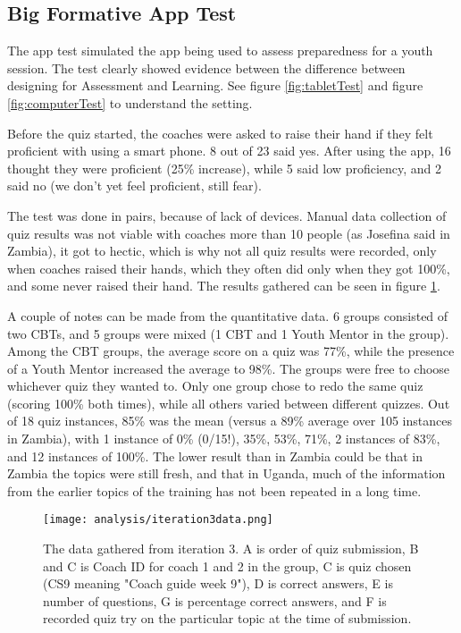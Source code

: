 
    \subsection{Big Formative App Test}
  The app test simulated the app being used to assess preparedness for a youth session. The test clearly showed evidence between the difference between designing for Assessment and Learning. See figure \ref{fig:tabletTest} and figure \ref{fig:computerTest} to understand the setting.

  Before the quiz started, the coaches were asked to raise their hand if they felt proficient with using a smart phone. 8 out of 23 said yes. After using the app, 16 thought they were proficient (25\% increase), while 5 said low proficiency, and 2 said no (we don't yet feel proficient, still fear).

  The test was done in pairs, because of lack of devices. Manual data collection of quiz results was not viable with coaches more than 10 people (as Josefina said in Zambia), it got to hectic, which is why not all quiz results were recorded, only when coaches raised their hands, which they often did only when they got 100\%, and some never raised their hand. The results gathered can be seen in figure \ref{fig:iteration3data}.

  A couple of notes can be made from the quantitative data. 6 groups consisted of two CBTs, and 5 groups were mixed (1 CBT and 1 Youth Mentor in the group). Among the CBT groups, the average score on a quiz was 77\%, while the presence of a Youth Mentor increased the average to 98\%. The groups were free to choose whichever quiz they wanted to. Only one group chose to redo the same quiz (scoring 100\% both times), while all others varied between different quizzes. Out of 18 quiz instances, 85\% was the mean (versus a 89\% average over 105 instances in Zambia), with 1 instance of 0\% (0/15!), 35\%, 53\%, 71\%, 2 instances of 83\%, and 12 instances of 100\%. The lower result than in Zambia could be that in Zambia the topics were still fresh, and that in Uganda, much of the information from the earlier topics of the training has not been repeated in a long time.

  \begin{figure}[h]
    \centering
    \texttt{[image: analysis/iteration3data.png]}
    \caption{The data gathered from iteration 3. A is order of quiz submission, B and C is Coach ID for coach 1 and 2 in the group, C is quiz chosen (CS9 meaning "Coach guide week 9"), D is correct answers, E is number of questions, G is percentage correct answers, and F is recorded quiz try on the particular topic at the time of submission.}
    \label{fig:iteration3data}
  \end{figure}

